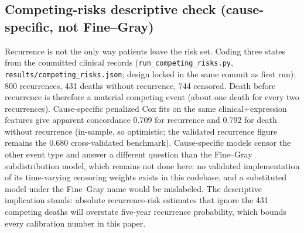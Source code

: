 \subsection{Competing-risks descriptive check (cause-specific, not Fine--Gray)}
Recurrence is not the only way patients leave the risk set. Coding three states from the committed clinical records (\texttt{run\_competing\_risks.py}, \texttt{results/competing\_risks.json}; design locked in the same commit as first run): 800 recurrences, 431 deaths without recurrence, 744 censored. Death before recurrence is therefore a material competing event (about one death for every two recurrences). Cause-specific penalized Cox fits on the same clinical$+$expression features give apparent concordance 0.709 for recurrence and 0.792 for death without recurrence (in-sample, so optimistic; the validated recurrence figure remains the 0.680 cross-validated benchmark). Cause-specific models censor the other event type and answer a different question than the Fine--Gray subdistribution model, which remains not done here: no validated implementation of its time-varying censoring weights exists in this codebase, and a substituted model under the Fine--Gray name would be mislabeled. The descriptive implication stands: absolute recurrence-risk estimates that ignore the 431 competing deaths will overstate five-year recurrence probability, which bounds every calibration number in this paper.
